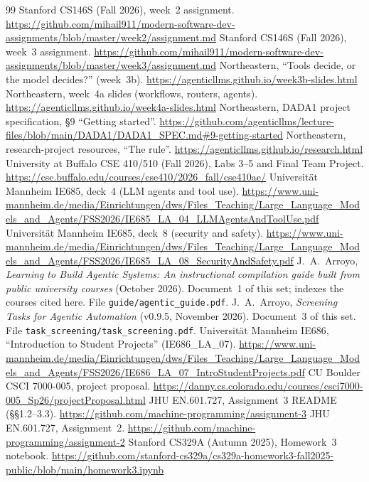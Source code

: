 \documentclass[10pt]{article}
\begin{document}
\begin{thebibliography}{99}
 Stanford CS146S (Fall 2026), week~2 assignment. \url{https://github.com/mihail911/modern-software-dev-assignments/blob/master/week2/assignment.md}
 Stanford CS146S (Fall 2026), week~3 assignment. \url{https://github.com/mihail911/modern-software-dev-assignments/blob/master/week3/assignment.md}
 Northeastern, ``Tools decide, or the model decides?'' (week~3b). \url{https://agenticllms.github.io/week3b-slides.html}
 Northeastern, week~4a slides (workflows, routers, agents). \url{https://agenticllms.github.io/week4a-slides.html}
 Northeastern, DADA1 project specification, \S9 ``Getting started''. \url{https://github.com/agenticllms/lecture-files/blob/main/DADA1/DADA1_SPEC.md\#9-getting-started}
 Northeastern, research-project resources, ``The rule''. \url{https://agenticllms.github.io/research.html}
 University at Buffalo CSE 410/510 (Fall 2026), Labs 3--5 and Final Team Project. \url{https://cse.buffalo.edu/courses/cse410/2026_fall/cse410ae/}
 Universit\"at Mannheim IE685, deck~4 (LLM agents and tool use). \url{https://www.uni-mannheim.de/media/Einrichtungen/dws/Files_Teaching/Large_Language_Models_and_Agents/FSS2026/IE685_LA_04_LLMAgentsAndToolUse.pdf}
 Universit\"at Mannheim IE685, deck~8 (security and safety). \url{https://www.uni-mannheim.de/media/Einrichtungen/dws/Files_Teaching/Large_Language_Models_and_Agents/FSS2026/IE685_LA_08_SecurityAndSafety.pdf}
 J.~A.~Arroyo, \emph{Learning to Build Agentic Systems: An instructional compilation guide built from public university courses} (October 2026). Document~1 of this set; indexes the courses cited here. File \texttt{guide/agentic\_guide.pdf}.
 J.~A.~Arroyo, \emph{Screening Tasks for Agentic Automation} (v0.9.5, November 2026). Document~3 of this set. File \texttt{task\_screening/task\_screening.pdf}.
 Universit\"at Mannheim IE686, ``Introduction to Student Projects'' (IE686\_LA\_07). \url{https://www.uni-mannheim.de/media/Einrichtungen/dws/Files_Teaching/Large_Language_Models_and_Agents/FSS2026/IE686_LA_07_IntroStudentProjects.pdf}
 CU Boulder CSCI 7000-005, project proposal. \url{https://danny.cs.colorado.edu/courses/csci7000-005_Sp26/projectProposal.html}
 JHU EN.601.727, Assignment~3 README (\S\S1.2--3.3). \url{https://github.com/machine-programming/assignment-3}
 JHU EN.601.727, Assignment~2. \url{https://github.com/machine-programming/assignment-2}
 Stanford CS329A (Autumn 2025), Homework~3 notebook. \url{https://github.com/stanford-cs329a/cs329a-homework3-fall2025-public/blob/main/homework3.ipynb}

\end{thebibliography}
\end{document}
